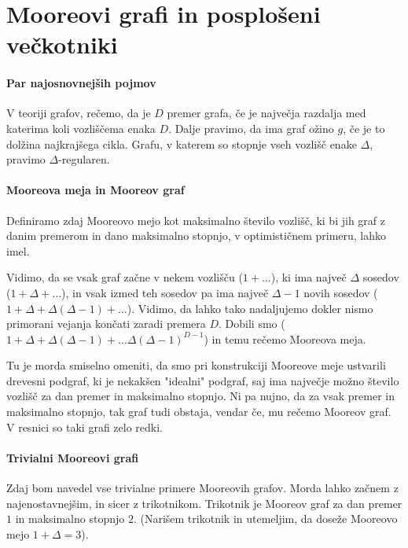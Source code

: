 \documentclass{fmfkpb}
\begin{document}
\makefrontpage
\cleardoublepage

\section{Mooreovi grafi in posplošeni večkotniki}

\paragraph{Par najosnovnejših pojmov}
V teoriji grafov, rečemo, da je $D$ premer grafa, če je največja razdalja med katerima
koli vozliščema enaka $D$.
Dalje pravimo, da ima graf ožino $g$, če je to dolžina najkrajšega cikla.
Grafu, v katerem so stopnje vseh vozlišč enake $\Delta$, pravimo $\Delta$-regularen.


\paragraph{Mooreova meja in Mooreov graf}
Definiramo zdaj Mooreovo mejo kot maksimalno število vozlišč, ki bi jih 
graf z danim premerom in dano maksimalno stopnjo, 
v optimističnem primeru, lahko imel.

Vidimo, da se
vsak graf začne v nekem vozlišču ($1 + \ldots$),
ki ima največ $\Delta$ sosedov ($1 + \Delta + \ldots$), 
in vsak izmed teh sosedov
pa ima največ $\Delta - 1$ novih sosedov ($1 + \Delta + \Delta(\Delta - 1) + \ldots$).
Vidimo, da lahko tako nadaljujemo dokler nismo primorani vejanja končati 
zaradi premera $D$. Dobili smo 
($1 + \Delta + \Delta(\Delta - 1) + \ldots \Delta (\Delta - 1)^{D - 1}$) in 
temu rečemo Mooreova meja.

Tu je morda smiselno omeniti, da smo pri konstrukciji Mooreove meje ustvarili 
drevesni podgraf, ki je nekakšen "idealni" podgraf, saj ima največje 
možno število vozlišč za dan premer in maksimalno stopnjo.
Ni pa nujno, da za vsak premer in maksimalno stopnjo, tak graf tudi obstaja,
vendar če, mu rečemo Mooreov graf.
V resnici so taki grafi zelo redki.

\paragraph{Trivialni Mooreovi grafi}
Zdaj bom navedel vse trivialne primere Mooreovih grafov. Morda lahko 
začnem z najenostavnejšim, in sicer z trikotnikom. Trikotnik je Mooreov graf
za dan premer $1$ in maksimalno stopnjo $2$. (Narišem trikotnik in utemeljim,
da doseže Mooreovo mejo $1 + \Delta = 3$).
\end{document}
